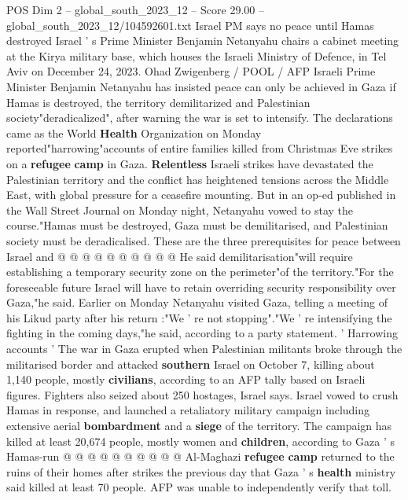 \begin{textsample}{POS Dim 2 – global\_south\_2023\_12 – Score 29.00 – global\_south\_2023\_12/104592601.txt}  \label{ex:f2_pos_027}
Israel PM says no peace until Hamas destroyed Israel ' s Prime Minister Benjamin Netanyahu chairs a cabinet meeting at the Kirya military base, which houses the Israeli Ministry of Defence, in Tel Aviv on December 24, 2023.
Ohad Zwigenberg / POOL / AFP Israeli Prime Minister Benjamin Netanyahu has insisted peace can only be achieved in Gaza if Hamas is destroyed, the territory demilitarized and Palestinian society"deradicalized", after warning the war is set to intensify.
The declarations came as the World \textbf{Health} Organization on Monday reported"harrowing"accounts of entire families killed from Christmas Eve strikes on a \textbf{refugee} \textbf{camp} in Gaza. \textbf{Relentless} Israeli strikes have devastated the Palestinian territory and the conflict has heightened tensions across the Middle East, with global pressure for a ceasefire mounting.
But in an op-ed published in the Wall Street Journal on Monday night, Netanyahu vowed to stay the course."Hamas must be destroyed, Gaza must be demilitarised, and Palestinian society must be deradicalised.
These are the three prerequisites for peace between Israel and @ @ @ @ @ @ @ @ @ @ He said demilitarisation"will require establishing a temporary security zone on the perimeter"of the territory."For the foreseeable future Israel will have to retain overriding security responsibility over Gaza,"he said.
Earlier on Monday Netanyahu visited Gaza, telling a meeting of his Likud party after his return :"We ' re not stopping"."We ' re intensifying the fighting in the coming days,"he said, according to a party statement. ' Harrowing accounts ' The war in Gaza erupted when Palestinian militants broke through the militarised border and attacked \textbf{southern} Israel on October 7, killing about 1,140 people, mostly \textbf{civilians}, according to an AFP tally based on Israeli figures.
Fighters also seized about 250 hostages, Israel says.
Israel vowed to crush Hamas in response, and launched a retaliatory military campaign including extensive aerial \textbf{bombardment} and a \textbf{siege} of the territory.
The campaign has killed at least 20,674 people, mostly women and \textbf{children}, according to Gaza ' s Hamas-run @ @ @ @ @ @ @ @ @ @ Al-Maghazi \textbf{refugee} \textbf{camp} returned to the ruins of their homes after strikes the previous day that Gaza ' s \textbf{health} ministry said killed at least 70 people.
AFP was unable to independently verify that toll.

\end{textsample}
